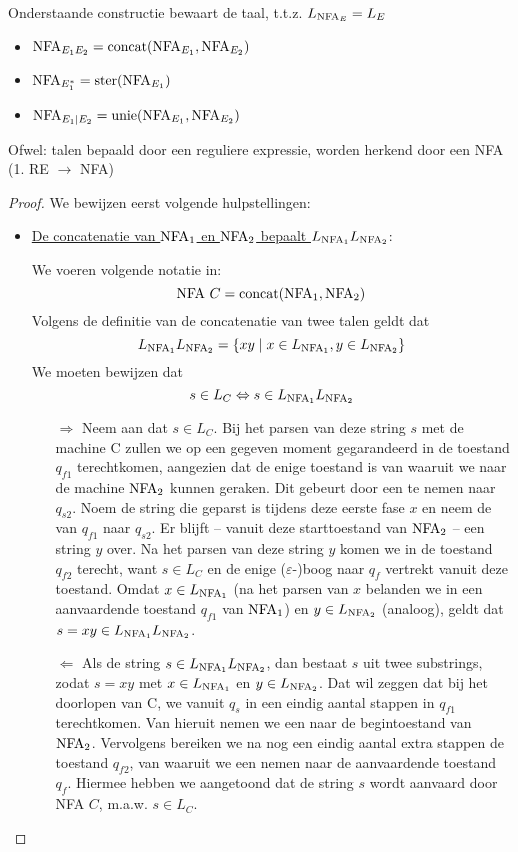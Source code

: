 \documentclass[../aanvullingen_cursus.tex]{subfiles}
\begin{document}
\begin{stelling}
	Onderstaande constructie bewaart de taal, t.t.z. \( L_{\text{NFA}_E}=L_E \)
	\begin{itemize}
		\item \( \text{NFA}_{E_1E_2}=\operatorname*{concat}(\text{NFA}_{E_1},\text{NFA}_{E_2}) \)
		\item \( \text{NFA}_{E_1^*}=\operatorname*{ster}(\text{NFA}_{E_1}) \)
		\item \( \text{NFA}_{E_1|E_2}=\operatorname*{unie}(\text{NFA}_{E_1},\text{NFA}_{E_2}) \)
	\end{itemize}
	Ofwel: talen bepaald door een reguliere expressie, worden herkend door een NFA (1. RE \(\rightarrow\) NFA)
\end{stelling}

\begin{proof}
	We bewijzen eerst volgende hulpstellingen:
	\begin{itemize}
		\item \underline{De concatenatie van \( \text{NFA}_1 \) en \( \text{NFA}_2 \) bepaalt \( L_{\text{NFA}_1}L_{\text{NFA}_2} \)}:

		We voeren volgende notatie in: \[ \text{NFA } C = \operatorname*{concat}(\text{NFA}_{1},\text{NFA}_{2}) \] Volgens de definitie van de concatenatie van twee talen geldt dat \[ L_{\text{NFA}_1}L_{\text{NFA}_2}=\{xy \mid x \in L_{\text{NFA}_1}, y \in L_{\text{NFA}_2}\} \] We moeten bewijzen dat \[ s \in L_{C} \Leftrightarrow s \in L_{\text{NFA}_1}L_{\text{NFA}_2} \]
		\begin{enumerate}
			\item[\( \Rightarrow \)] Neem aan dat \( s \in L_C \). Bij het parsen van deze string \( s \) met de machine C zullen we op een gegeven moment gegarandeerd in de toestand \(q_{f1}\) terechtkomen, aangezien dat de enige toestand is van waaruit we naar de machine \( \text{NFA}_2 \) kunnen geraken. Dit gebeurt door een \epsilonboog  te nemen naar \( q_{s2} \). Noem de string die geparst is tijdens deze eerste fase \(x\) en neem de \epsilonboog van \( q_{f1} \) naar \( q_{s2} \). Er blijft -- vanuit deze starttoestand van \( \text{NFA}_2 \) -- een string \( y \) over. Na het parsen van deze string \( y \) komen we in de toestand \( q_{f2} \) terecht, want \( s \in L_C \) en de enige (\(\varepsilon\)-)boog naar \( q_f \) vertrekt vanuit deze toestand. Omdat \( x \in L_{\text{NFA}_1} \) (na het parsen van \( x \) belanden we in een aanvaardende toestand \( q_{f1} \) van \( \text{NFA}_1 \)) en \( y \in L_{\text{NFA}_2} \) (analoog), geldt dat \( s = xy \in L_{\text{NFA}_1}L_{\text{NFA}_2} \).
			\item[\(\Leftarrow\)] Als de string \( s \in L_{\text{NFA}_1}L_{\text{NFA}_2} \), dan bestaat \( s \) uit twee substrings, zodat \( s=xy \) met \( x \in L_{\text{NFA}_1} \) en \( y \in L_{\text{NFA}_2} \). Dat wil zeggen dat bij het doorlopen van C, we vanuit \( q_s \) in een eindig aantal stappen in \( q_{f1} \) terechtkomen. Van hieruit nemen we een \epsilonboog naar de begintoestand van \( \text{NFA}_2 \). Vervolgens bereiken we na nog een eindig aantal extra stappen de toestand \(q_{f2}\), van waaruit we een \epsilonboog nemen naar de aanvaardende toestand \(q_f\). Hiermee hebben we aangetoond dat de string \(s\) wordt aanvaard door NFA \(C\), m.a.w. \(s \in L_{C}.\)
		\end{enumerate}


\end{itemize}
\end{proof}
\end{document}
